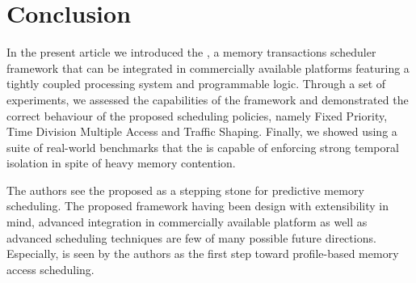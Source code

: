 \section{Conclusion}
    

In the present article we introduced the \schim, a memory transactions
scheduler framework that can be integrated in commercially available
platforms featuring a tightly coupled processing system and
programmable logic. Through a set of experiments, we assessed the
capabilities of the framework and demonstrated the correct behaviour
of the proposed scheduling policies, namely Fixed Priority, Time
Division Multiple Access and Traffic Shaping. Finally, we showed using
a suite of real-world benchmarks that the \schim is capable of
enforcing strong temporal isolation in spite of heavy memory
contention.
    
The authors see the proposed \schim as a stepping stone for predictive
memory scheduling. The proposed framework having been design with
extensibility in mind, advanced integration in commercially available
platform as well as advanced scheduling techniques are few of many
possible future directions. Especially, \schim is seen by the authors
as the first step toward profile-based memory access scheduling.
